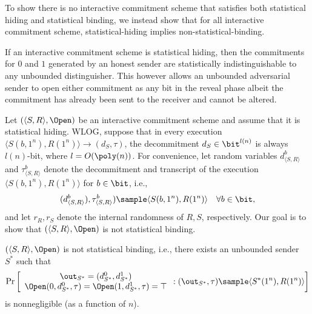 \clearpage
\begin{answer}[d]
    To show there is no interactive commitment scheme that satisfies both statistical hiding and statistical binding, we instead show that for all interactive commitment scheme, statistical-hiding implies non-statistical-binding.
    \begin{intuition}
        If an interactive commitment scheme is statistical hiding, then the commitments for $0$ and $1$ generated by an honest sender are statistically indistinguishable to any unbounded distinguisher. This however allows an unbounded adversarial sender to open either commitment as any bit in the reveal phase albeit the commitment has already been sent to the receiver and cannot be altered.
    \end{intuition}

    Let $(\langle S,R\rangle,\Open)$ be an interactive commitment scheme and assume that it is statistical hiding. WLOG, suppose that in every execution $\langle S(b,1^n), R(1^n)\rangle\to (d_S, \tau)$, the decommitment $d_S\in \bit^{l(n)}$ is always $l(n)$-bit, where $l=O(\poly(n))$.  For convenience, let random variables $d_{\langle S,R\rangle}^b$ and $\tau_{\langle S,R\rangle}^b$ denote the decommitment and transcript of the execution $\langle S(b,1^n), R(1^n)\rangle$ for $b\in\bit$, i.e., 
    \[
        (d_{\langle S,R\rangle}^b), \tau_{\langle S,R\rangle}^b) \sample \langle S(b,1^n), R(1^n)\rangle \quad \forall b\in\bit,
    \] and let $r_R, r_S$ denote the internal randomness of $R,S$, respectively. Our goal is to show that $(\langle S,R\rangle,\Open)$ is not statistical binding.
    \begin{goal}
        $(\langle S,R\rangle,\Open)$ is not statistical binding, i.e., there exists an unbounded sender $S^\ast$ such that
        \[
            \Pr\left[ \begin{array}{c}
                 \out_{S^\ast}=(d^0_{S^\ast},d^1_{S^\ast})  \\
                 \Open(0,d^0_{S^\ast},\tau) = \Open(1,d^1_{S^\ast},\tau)=\top
            \end{array} : (\out_{S^\ast} , \tau)\sample \langle S^\ast(1^n), R(1^n)\rangle \right]
        \]
        is nonnegligible (as a function of $n$).
    \end{goal}


\end{answer}
